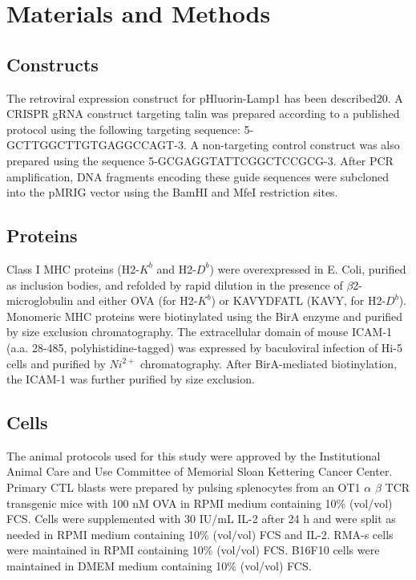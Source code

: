 \section{Materials and Methods}

\subsection{Constructs}
The retroviral expression construct for pHluorin-Lamp1 has been described20. A CRISPR gRNA construct targeting talin was prepared according to a published protocol \cite{Huang2019} using the following targeting sequence: 5\textquotesingle -GCTTGGCTTGTGAGGCCAGT-3\textquotesingle. A non-targeting control construct was also prepared using the sequence 5\textquotesingle -GCGAGGTATTCGGCTCCGCG-3\textquotesingle. After PCR amplification, DNA fragments encoding these guide sequences were subcloned into the pMRIG vector using the BamHI and MfeI restriction sites.

\subsection{Proteins}
Class I MHC proteins (H2-$K^{b}$ and H2-$D^{b}$) were overexpressed in E. Coli, purified as inclusion bodies, and refolded by rapid dilution in the presence of $\beta$2-microglobulin and either OVA (for H2-$K^{b}$) or KAVYDFATL (KAVY, for H2-$D^{b}$). Monomeric MHC proteins were biotinylated using the BirA enzyme and purified by size exclusion chromatography. The extracellular domain of mouse ICAM-1 (a.a. 28-485, polyhistidine-tagged) was expressed by baculoviral infection of Hi-5 cells and purified by $Ni^{2+}$ chromatography. After BirA-mediated biotinylation, the ICAM-1 was further purified by size exclusion.

\subsection{Cells}
The animal protocols used for this study were approved by the Institutional Animal Care and Use Committee of Memorial Sloan Kettering Cancer Center. Primary CTL blasts were prepared by pulsing splenocytes from an OT1 $\alpha$ $\beta$ TCR transgenic mice with 100 nM OVA in RPMI medium containing 10\% (vol/vol) FCS. Cells were supplemented with 30 IU/mL IL-2 after 24 h and were split as needed in RPMI medium containing 10\% (vol/vol) FCS and IL-2. RMA-s cells were maintained in RPMI containing 10\% (vol/vol) FCS. B16F10 cells were maintained in DMEM medium containing 10\% (vol/vol) FCS.


